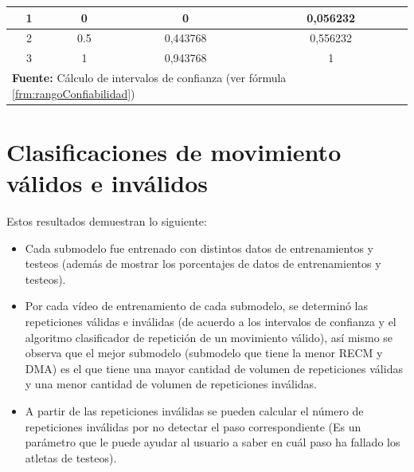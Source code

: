 \begin{table}[H]
\begin{center}
\begin{tabular}{cccc}
\multicolumn{1}{|c|}{1} & \multicolumn{1}{c|}{0} & \multicolumn{1}{c|}{0} & \multicolumn{1}{c|}{0,056232} \\ \hline
\multicolumn{1}{|c|}{2} & \multicolumn{1}{c|}{0.5} & \multicolumn{1}{c|}{0,443768} & \multicolumn{1}{c|}{0,556232} \\ \hline
\multicolumn{1}{|c|}{3} & \multicolumn{1}{c|}{1} & \multicolumn{1}{c|}{0,943768} & \multicolumn{1}{c|}{1} \\ \hline
\multicolumn{4}{l}{\textbf{Fuente:} C\'alculo de intervalos de confianza (ver f\'ormula \ref{frm:rangoConfiabilidad})}
\end{tabular}
\end{center}
\end{table}
\section{Clasificaciones de movimiento v\'alidos e inv\'alidos} \label{res:clasiMov}
Estos resultados demuestran lo siguiente:
\begin{itemize}
\item  Cada submodelo fue entrenado con distintos datos de entrenamientos y testeos (adem\'as de mostrar los porcentajes de datos de entrenamientos y testeos).
\item Por cada v\'ideo de entrenamiento de cada submodelo, se determin\'o  las repeticiones v\'alidas e inv\'alidas (de acuerdo a los intervalos de confianza  y el algoritmo clasificador de repetici\'on de un movimiento v\'alido), as\'i mismo se observa que el mejor submodelo (submodelo que tiene la menor RECM y DMA) es el que tiene una mayor cantidad de volumen de repeticiones v\'alidas y una menor cantidad de volumen de repeticiones inv\'alidas.
\item A partir de las repeticiones inv\'alidas se pueden calcular el n\'umero de repeticiones inv\'alidas por no detectar el paso correspondiente (Es un par\'ametro que le puede ayudar al usuario a saber en cu\'al paso ha fallado los atletas de testeos). 
\end{itemize}
